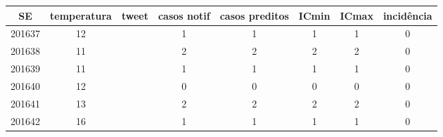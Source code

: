 \begin{tabular}{c|ccccccc}
  \hline
SE & temperatura & tweet & casos notif & casos preditos & ICmin & ICmax & incidência \\ 
  \hline
201637 & 12 &  & 1 & 1 & 1 & 1 & 0 \\ 
  201638 & 11 &  & 2 & 2 & 2 & 2 & 0 \\ 
  201639 & 11 &  & 1 & 1 & 1 & 1 & 0 \\ 
  201640 & 12 &  & 0 & 0 & 0 & 0 & 0 \\ 
  201641 & 13 &  & 2 & 2 & 2 & 2 & 0 \\ 
  201642 & 16 &  & 1 & 1 & 1 & 1 & 0 \\ 
   \hline
\end{tabular}
